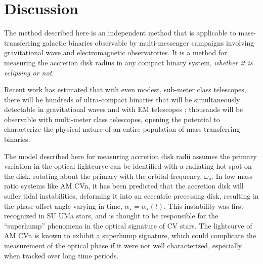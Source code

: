 \documentclass[preprint2]{aastex}
\newcommand{\note}[1]{[$\blacktriangleright$~\textbf{#1}~$\blacktriangleleft$]}
\begin{document}




\section{Discussion}\label{sec.discussion}
The method described here is an independent method that is applicable
to mass-transferring galactic binaries observable by multi-messenger
campaigns involving gravitational wave and electromagnetic
observatories.  It is a method for measuring the accretion disk radius
in any compact binary system, \textit{whether it is eclipsing or not.}

Recent work has estimated that with even modest, sub-meter class 
telescopes, there will be hundreds of ultra-compact binaries that 
will be simultaneously detectable in gravitational waves and with EM 
telescopes \citep{LLCN2013}; thousands will be observable with 
multi-meter class telescopes, opening the potential to characterize 
the physical nature of an entire population of mass transferring 
binaries.

The model described here for measuring accretion disk radii assumes
the primary variation in the optical lightcurve can be identified
with a radiating hot spot on the disk, rotating about the primary with
the orbital frequency, $\omega_{o}$.  In low mass ratio systems like
AM CVn, it has been predicted that the accretion disk will suffer
tidal instabilities, deforming it into an eccentric precessing disk,
resulting in the phase offset angle varying in time, $\alpha_\star =
\alpha_\star(t)$.  This instability was first recognized in SU UMa stars,
and is thought to be responsible for the ``superhump'' phenomena in
the optical signature of CV stars.  The lightcurve of AM CVn is known
to exhibit a superhump signature, which could complicate the
measurement of the optical phase if it were not well characterized,
especially when tracked over long time periods.
\end{document}
